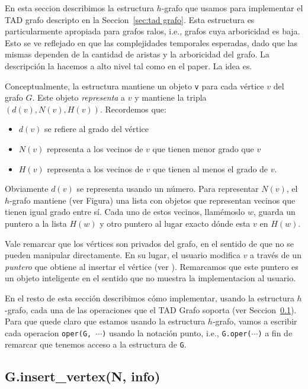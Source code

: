 \documentclass[a4paper,12pt]{article}
\begin{document}
En esta seccion describimos la estructura $h$-grafo que usamos para implementar el TAD grafo descripto en la Seccion~\ref{sec:tad grafo}.  Esta estructura es particularmente apropiada para grafos ralos, i.e., grafos cuya arboricidad es baja.  Esto se ve reflejado en que las complejidades temporales esperadas, dado que las mismas dependen de la cantidad de aristas y la arboricidad del grafo.  La descripción la hacemos a alto nivel tal como en el paper.  La idea es.


Conceptualmente, la estructura mantiene un objeto \texttt{v} para cada vértice $v$ del grafo $G$.  Este objeto \emph{representa} a $v$ y mantiene la tripla $(d(v), N(v), H(v))$.  Recordemos que:   
\begin{itemize}
\item $d(v)$ se refiere al grado del vértice
\item $N(v)$ representa a los vecinos de $v$ que tienen menor grado que $v$
\item $H(v)$ representa a los vecinos de $v$ que tienen al menos el grado de $v$.
\end{itemize}

 Obviamente $d(v)$ se representa usando un número. Para representar $N(v)$, el $h$-grafo mantiene (ver Figura) una lista con objetos que representan vecinos que tienen igual grado entre sí. Cada uno de estos vecinos,   llamémoslo $w$,  guarda un puntero a la lista $H(w)$ y otro puntero al lugar exacto dónde esta $v$ en $H(w)$.

Vale remarcar que los vértices son privados del grafo, en el sentido de que no se pueden manipular directamente.  En su lugar, el usuario modifica $v$ a través de un \emph{puntero} que obtiene al insertar el vértice (ver ).  Remarcamos que este puntero es un objeto inteligente en el sentido que no muestra la implementacion al usuario.

En el resto de esta sección describimos cómo implementar, usando la estructura $h$-grafo, cada una de las operaciones que el TAD Grafo soporta (ver Seccion~\ref{}).  Para que quede claro que estamos usando la estructura $h$-grafo, vamos a escribir cada operacion \texttt{oper(G, $\cdots$)} usando la notación punto, i.e., \texttt{G.oper($\cdots$)} a fin de remarcar que tenemos acceso a la estructura de \texttt{G}.


\subsection{G.insert\_vertex(N, info)}
\end{document}

